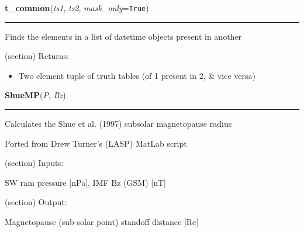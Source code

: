     \vspace{0.5ex}

\hspace{.8\funcindent}\begin{boxedminipage}{\funcwidth}

    \raggedright \textbf{t\_common}(\textit{ts1}, \textit{ts2}, \textit{mask\_only}={\tt True})

    \vspace{-1.5ex}

    \rule{\textwidth}{0.5\fboxrule}
\setlength{\parskip}{2ex}
    Finds the elements in a list of datetime objects present in another

    (section) Returns:

      \begin{itemize}
      \setlength{\parskip}{0.6ex}
        \item Two element tuple of truth tables (of 1 present in 2, \& vice 
          versa)

      \end{itemize}

\setlength{\parskip}{1ex}
    \end{boxedminipage}

    \label{spacepy:utils:ShueMP}

    \vspace{0.5ex}

\hspace{.8\funcindent}\begin{boxedminipage}{\funcwidth}

    \raggedright \textbf{ShueMP}(\textit{P}, \textit{Bz})

    \vspace{-1.5ex}

    \rule{\textwidth}{0.5\fboxrule}
\setlength{\parskip}{2ex}
    Calculates the Shue et al. (1997) subsolar magnetopause radius

    Ported from Drew Turner's (LASP) MatLab script

    (section) Inputs:

      SW ram pressure [nPa], IMF Bz (GSM) [nT]

    (section) Output:

      Magnetopause (sub-solar point) standoff distance [Re]

\setlength{\parskip}{1ex}
    \end{boxedminipage}

